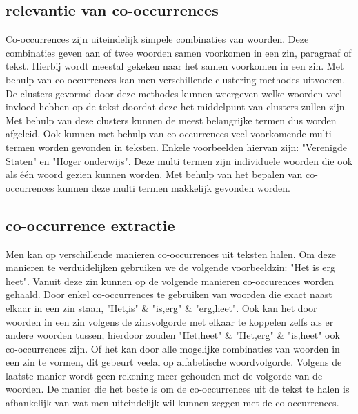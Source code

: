 \subsection{relevantie van co-occurrences}
Co-occurrences zijn uiteindelijk simpele combinaties van woorden. Deze combinaties geven aan of twee woorden samen voorkomen in een zin, paragraaf of tekst. Hierbij wordt meestal gekeken naar het samen voorkomen in een zin. Met behulp van co-occurrences kan men verschillende clustering methodes uitvoeren. De clusters gevormd door deze methodes kunnen weergeven welke woorden veel invloed hebben op de tekst doordat deze het middelpunt van clusters zullen zijn. Met behulp van deze clusters kunnen de meest belangrijke termen dus worden afgeleid. Ook kunnen met behulp van co-occurrences veel voorkomende multi termen worden gevonden in teksten. Enkele voorbeelden hiervan zijn: "Verenigde Staten" en "Hoger onderwijs". Deze multi termen zijn individuele woorden die ook als één woord gezien kunnen worden. Met behulp van het bepalen van co-occurrences kunnen deze multi termen makkelijk gevonden worden. 

\subsection{co-occurrence extractie}
Men kan op verschillende manieren co-occurrences uit teksten halen. Om deze manieren te verduidelijken gebruiken we de volgende voorbeeldzin: "Het is erg heet". Vanuit deze zin kunnen op de volgende manieren co-occurences worden gehaald. Door enkel co-occurrences te gebruiken van woorden die exact naast elkaar in een zin staan, "Het,is" \& "is,erg" \& "erg,heet". Ook kan het door woorden in een zin volgens de zinsvolgorde met elkaar te koppelen zelfs als er andere woorden tussen, hierdoor zouden "Het,heet" \& "Het,erg" \& "is,heet" ook co-occurrences zijn. Of het kan door alle mogelijke combinaties van woorden in een zin te vormen, dit gebeurt veelal op alfabetische woordvolgorde. Volgens de laatste manier wordt geen rekening meer gehouden met de volgorde van de woorden. De manier die het beste is om de co-occurrences uit de tekst te halen is afhankelijk van wat men uiteindelijk wil kunnen zeggen met de co-occurrences. \citep{shimohata1997retrieving}

